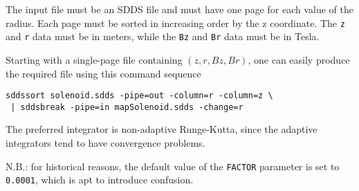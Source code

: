 The input file must be an SDDS file and must have one page for each value of the radius.
Each page must be sorted in increasing order by the z coordinate.
The \verb|z| and \verb|r| data must be in meters, while the \verb|Bz| and \verb|Br| data must
be in Tesla.

Starting with a single-page file containing $(z, r, Bz, Br)$, one can easily produce the
required file using this command sequence
\begin{verbatim}
sddssort solenoid.sdds -pipe=out -column=r -column=z \
 | sddsbreak -pipe=in mapSolenoid.sdds -change=r
\end{verbatim}

The preferred integrator is non-adaptive Runge-Kutta, since the adaptive integrators tend
to have convergence problems.

N.B.: for historical reasons, the default value of the \verb|FACTOR| parameter is set to \verb|0.0001|, which is
apt to introduce confusion.

